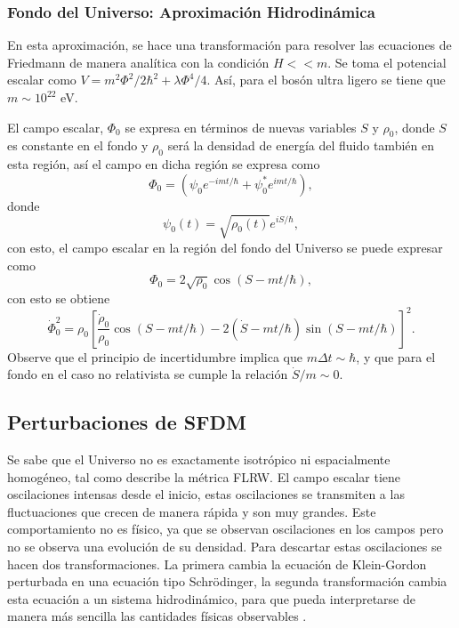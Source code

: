 \documentclass[a4paper,openright,12pt]{book}
\begin{document}
\subsubsection{Fondo del Universo: Aproximación Hidrodinámica}
En esta aproximación, se hace una transformación para resolver las ecuaciones de Friedmann de manera analítica con la condición $H<<m$. Se toma el potencial escalar como $V = m^{2}\Phi^{2}/2\hbar^{2} + \lambda\Phi^{4}/4$. Así, para el bosón ultra ligero se tiene que $m \sim 10^{22}$ eV.

El campo escalar, $\Phi_{0}$ se expresa en términos de nuevas variables $S$ y $\rho_{0}$, donde $S$ es constante en el fondo y $\rho_{0}$ será la densidad de energía del fluido también en esta región, así el campo en dicha región se expresa como
\begin{equation}
\Phi_{0} = (\psi_{0}e^{-imt/\hbar} + \psi_{0}^{*}e^{imt/\hbar}),\label{eqn 1.60}
\end{equation}
donde
\begin{equation}
\psi_{0}(t) = \sqrt{\rho_{0}(t)}e^{iS/\hbar},\label{eqn 1.61}
\end{equation}
con esto, el campo escalar en la región del fondo del Universo se puede expresar como 
\begin{equation}
\Phi_{0}=2\sqrt{\rho_{0}}\cos(S-mt/\hbar),\label{eqn 1.62}
\end{equation}
con esto se obtiene
\begin{equation}
\dot{\Phi}_{0}^{2} = \rho_{0} 
\left[
\frac{\dot{\rho}_{0}}{\rho_{0}}\cos(S-mt/\hbar) 
- 2(\dot{S}-mt/\hbar)\sin(S-mt/\hbar)
\right]^{2}.\label{eqn 1.63}
\end{equation}
Observe que el principio de incertidumbre implica que $m \Delta t \sim \hbar$, y que para el fondo en el caso no relativista se cumple la relación $\dot{S}/m \sim 0$. 
\subsection{Perturbaciones de SFDM}
Se sabe que el Universo no es exactamente isotrópico ni espacialmente homogéneo, tal como describe la métrica FLRW. El campo escalar tiene oscilaciones intensas desde el inicio, estas oscilaciones se transmiten a las fluctuaciones que crecen de manera rápida y son muy grandes. Este comportamiento no es físico, ya que se observan oscilaciones en los campos pero no se observa una evolución de su densidad. Para descartar estas oscilaciones se hacen dos transformaciones. La primera cambia la ecuación de Klein-Gordon perturbada en una ecuación tipo Schrödinger, la segunda transformación cambia esta ecuación a un sistema hidrodinámico, para que pueda interpretarse de manera más sencilla las cantidades físicas observables \cite{1.3.02.2}.
\end{document}
